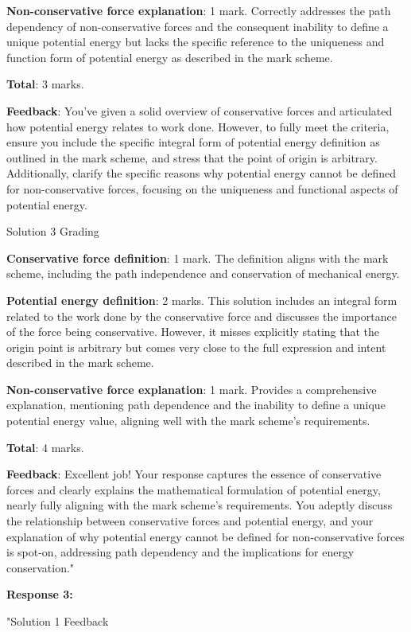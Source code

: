 \documentclass[a4paper,11pt]{article}
\begin{document}
\textbf{Non-conservative force explanation}: 1 mark. Correctly addresses the path dependency of non-conservative forces and the consequent inability to define a unique potential energy but lacks the specific reference to the uniqueness and function form of potential energy as described in the mark scheme.

\textbf{Total}: 3 marks.

\textbf{Feedback}: You've given a solid overview of conservative forces and articulated how potential energy relates to work done. However, to fully meet the criteria, ensure you include the specific integral form of potential energy definition as outlined in the mark scheme, and stress that the point of origin is arbitrary. Additionally, clarify the specific reasons why potential energy cannot be defined for non-conservative forces, focusing on the uniqueness and functional aspects of potential energy.

Solution 3 Grading

\textbf{Conservative force definition}: 1 mark. The definition aligns with the mark scheme, including the path independence and conservation of mechanical energy.

\textbf{Potential energy definition}: 2 marks. This solution includes an integral form related to the work done by the conservative force and discusses the importance of the force being conservative. However, it misses explicitly stating that the origin point is arbitrary but comes very close to the full expression and intent described in the mark scheme.

\textbf{Non-conservative force explanation}: 1 mark. Provides a comprehensive explanation, mentioning path dependence and the inability to define a unique potential energy value, aligning well with the mark scheme's requirements.

\textbf{Total}: 4 marks.

\textbf{Feedback}: Excellent job! Your response captures the essence of conservative forces and clearly explains the mathematical formulation of potential energy, nearly fully aligning with the mark scheme's requirements. You adeptly discuss the relationship between conservative forces and potential energy, and your explanation of why potential energy cannot be defined for non-conservative forces is spot-on, addressing path dependency and the implications for energy conservation."

\textbf{Response 3:}

"Solution 1 Feedback
\end{document}
